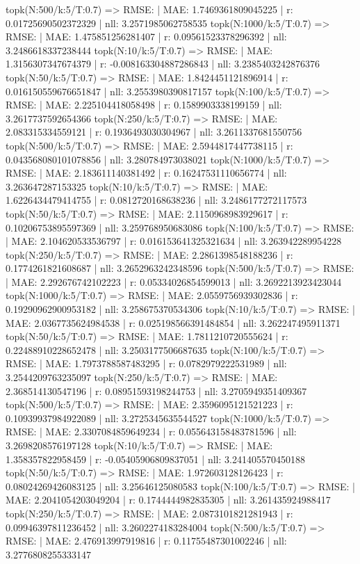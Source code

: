 topk(N:500/k:5/T:0.7) => RMSE: | MAE: 1.7469361809045225 | r: 0.01725690502372329 | nll: 3.2571985062758535
topk(N:1000/k:5/T:0.7) => RMSE: | MAE: 1.475851256281407 | r: 0.09561523378296392 | nll: 3.2486618337238444
topk(N:10/k:5/T:0.7) => RMSE: | MAE: 1.3156307347674379 | r: -0.008163304887286843 | nll: 3.2385403242876376
topk(N:50/k:5/T:0.7) => RMSE: | MAE: 1.8424451121896914 | r: 0.016150559676651847 | nll: 3.2553980390817157
topk(N:100/k:5/T:0.7) => RMSE: | MAE: 2.225104418058498 | r: 0.1589903338199159 | nll: 3.2617737592654366
topk(N:250/k:5/T:0.7) => RMSE: | MAE: 2.083315334559121 | r: 0.1936493030304967 | nll: 3.2611337681550756
topk(N:500/k:5/T:0.7) => RMSE: | MAE: 2.5944817447738115 | r: 0.043568080101078856 | nll: 3.280784973038021
topk(N:1000/k:5/T:0.7) => RMSE: | MAE: 2.183611140381492 | r: 0.16247531110656774 | nll: 3.263647287153325
topk(N:10/k:5/T:0.7) => RMSE: | MAE: 1.6226434479414755 | r: 0.0812720168638236 | nll: 3.2486177272117573
topk(N:50/k:5/T:0.7) => RMSE: | MAE: 2.1150968983929617 | r: 0.10206753895597369 | nll: 3.259768950683086
topk(N:100/k:5/T:0.7) => RMSE: | MAE: 2.104620533536797 | r: 0.016153641325321634 | nll: 3.263942289954228
topk(N:250/k:5/T:0.7) => RMSE: | MAE: 2.2861398548188236 | r: 0.1774261821608687 | nll: 3.2652963242348596
topk(N:500/k:5/T:0.7) => RMSE: | MAE: 2.292676742102223 | r: 0.05334026854599013 | nll: 3.2692213923423044
topk(N:1000/k:5/T:0.7) => RMSE: | MAE: 2.0559756939302836 | r: 0.19290962900953182 | nll: 3.258675370534306
topk(N:10/k:5/T:0.7) => RMSE: | MAE: 2.0367735624984538 | r: 0.025198566391484854 | nll: 3.262247495911371
topk(N:50/k:5/T:0.7) => RMSE: | MAE: 1.7811210720555624 | r: 0.22488910228652478 | nll: 3.2503177506687635
topk(N:100/k:5/T:0.7) => RMSE: | MAE: 1.7973788587483295 | r: 0.0782979222531989 | nll: 3.2544209763235097
topk(N:250/k:5/T:0.7) => RMSE: | MAE: 2.368514130547196 | r: 0.08951593198244753 | nll: 3.2705949351409367
topk(N:500/k:5/T:0.7) => RMSE: | MAE: 2.3596095121521223 | r: 0.10939937984922089 | nll: 3.2725345635544527
topk(N:1000/k:5/T:0.7) => RMSE: | MAE: 2.3307084859649234 | r: 0.055643158483781596 | nll: 3.2698208576197128
topk(N:10/k:5/T:0.7) => RMSE: | MAE: 1.358357822958459 | r: -0.05405906809837051 | nll: 3.241405570450188
topk(N:50/k:5/T:0.7) => RMSE: | MAE: 1.972603128126423 | r: 0.08024269426083125 | nll: 3.25646125080583
topk(N:100/k:5/T:0.7) => RMSE: | MAE: 2.2041054203049204 | r: 0.1744444982835305 | nll: 3.261435924988417
topk(N:250/k:5/T:0.7) => RMSE: | MAE: 2.0873101821281943 | r: 0.09946397811236452 | nll: 3.2602274183284004
topk(N:500/k:5/T:0.7) => RMSE: | MAE: 2.476913997919816 | r: 0.11755487301002246 | nll: 3.2776808255333147
